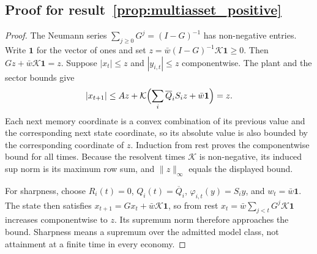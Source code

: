 \documentclass[11pt]{article}
\theoremstyle{definition}
\theoremstyle{remark}
\begin{document}
\subsection{Proof for result~\ref{prop:multiasset_positive}}\label{app:paper3proof4}
\begin{proof}
The Neumann series $\sum_{j\ge0}G^j=(I-G)^{-1}$ has non-negative entries. Write $\mathbf1$ for the vector of ones and set $z=\bar w(I-G)^{-1}\mathcal K\mathbf1\ge0$. Then $Gz+\bar w\mathcal K\mathbf1=z$. Suppose $|x_t|\le z$ and $|y_{i,t}|\le z$ componentwise. The plant and the sector bounds give
\[
|x_{t+1}|\le A z+\mathcal K\Bigl(\sum_i\overline Q_i S_i z+\bar w\mathbf1\Bigr)=z.
\]
Each next memory coordinate is a convex combination of its previous value and the corresponding next state coordinate, so its absolute value is also bounded by the corresponding coordinate of $z$. Induction from rest proves the componentwise bound for all times. Because the resolvent times $\mathcal K$ is non-negative, its induced sup norm is its maximum row sum, and $\|z\|_\infty$ equals the displayed bound.

For sharpness, choose $R_i(t)=0$, $Q_i(t)=\overline Q_i$, $\varphi_{i,t}(y)=S_i y$, and $w_t=\bar w\mathbf1$. The state then satisfies $x_{t+1}=Gx_t+\bar w\mathcal K\mathbf1$, so from rest $x_t=\bar w\sum_{j<t}G^j\mathcal K\mathbf1$ increases componentwise to $z$. Its supremum norm therefore approaches the bound. Sharpness means a supremum over the admitted model class, not attainment at a finite time in every economy.
\end{proof}
\end{document}
